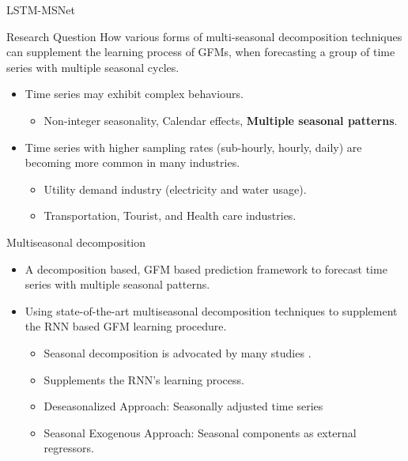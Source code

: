 \documentclass{beamer}
\begin{document}
\begin{frame}{LSTM-MSNet}
   \begin{block}{Research Question}	
	How various forms of multi-seasonal decomposition techniques can supplement the learning process of GFMs, when forecasting a group of time series with multiple seasonal cycles.
	\end{block}
	\begin{itemize}
	\item Time series may exhibit complex behaviours.
		\begin{itemize}
		\item \color{blue} Non-integer seasonality, Calendar effects, \textbf{Multiple seasonal patterns}.
		\end{itemize}
	\item Time series with higher sampling rates (sub-hourly, hourly, daily) are becoming more common in many industries.
		\begin{itemize}
\item \color{blue} Utility demand industry (electricity and water usage).
\item \color{blue} Transportation, Tourist, and Health care industries.
		\end{itemize}
 \end{itemize}
\end{frame} 

\begin{frame}{Multiseasonal decomposition}
\begin{itemize}
	\item A decomposition based, GFM based prediction framework to forecast time series with multiple seasonal patterns.
	\vspace{3mm}
	\item Using state-of-the-art multiseasonal decomposition techniques to supplement the RNN based GFM learning procedure.
	\vspace{2mm}
	  \begin{itemize}\color{blue}
		\item Seasonal decomposition is advocated by many studies \cite{Ben_Taieb2011-iu,Zhang2005-pk}.
		\item Supplements the RNN's learning process.
		\item Deseasonalized Approach: Seasonally adjusted time series
		\item Seasonal Exogenous Approach: Seasonal components as external regressors.
	  \end{itemize}			
 	\end{itemize}
\end{frame}
\end{document}

